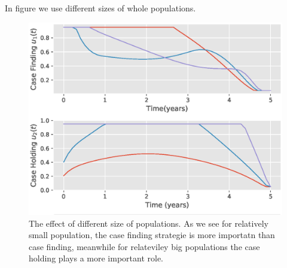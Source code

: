 In figure we use different sizes of whole populations.
\begin{figure}
\centering
\includegraphics[width=0.7\linewidth]{Figures/figure_3_two_strain_tbm}
  \caption{The effect of different size of populations. As we see for 
  relatively small population, the case finding strategie is more importatn 
  than case finding, meanwhile for relateviley big populations the case holding 
  plays a more important role.}
  \label{fig:figure3twostraintbm}
\end{figure}



